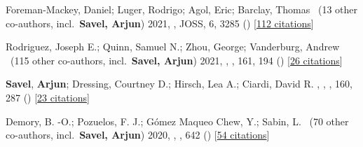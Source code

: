 \item[{\color{numcolor}\scriptsize4}] Foreman-Mackey, Daniel; Luger, Rodrigo; Agol, Eric; Barclay, Thomas \etal\ ({13} other co-authors, incl.\ \textbf{Savel, Arjun}) 2021, , JOSS, {6}, 3285 () [\href{https://ui.adsabs.harvard.edu/abs/2021JOSS....6.3285F}{112 citations}]

\item[{\color{numcolor}\scriptsize3}] Rodriguez, Joseph E.; Quinn, Samuel N.; Zhou, George; Vanderburg, Andrew \etal\ ({115} other co-authors, incl.\ \textbf{Savel, Arjun}) 2021, , \aj, {161}, 194 () [\href{https://ui.adsabs.harvard.edu/abs/2021AJ....161..194R}{26 citations}]

\item[{\color{numcolor}\scriptsize2}] \textbf{Savel}, \textbf{Arjun}; Dressing, Courtney D.; Hirsch, Lea A.; Ciardi, David R. , , \aj, {160}, 287 () [\href{https://ui.adsabs.harvard.edu/abs/2020AJ....160..287S}{23 citations}]

\item[{\color{numcolor}\scriptsize1}] Demory, B. -O.; Pozuelos, F. J.; G{\'o}mez Maqueo Chew, Y.; Sabin, L. \etal\ ({70} other co-authors, incl.\ \textbf{Savel, Arjun}) 2020, , \aanda, {642} () [\href{https://ui.adsabs.harvard.edu/abs/2020A&A...642A..49D}{54 citations}]